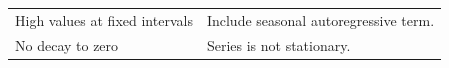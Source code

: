 \documentclass[]{book}
\begin{document}
\begin{longtable}[]{@{}ll@{}}
\begin{minipage}[t]{0.28\columnwidth}\raggedright\strut
High values at fixed intervals\strut
\end{minipage} & \begin{minipage}[t]{0.66\columnwidth}\raggedright\strut
Include seasonal autoregressive term.\strut
\end{minipage}\tabularnewline
\begin{minipage}[t]{0.28\columnwidth}\raggedright\strut
No decay to zero\strut
\end{minipage} & \begin{minipage}[t]{0.66\columnwidth}\raggedright\strut
Series is not stationary.\strut
\end{minipage}\tabularnewline
\bottomrule
\end{longtable}
\end{document}
